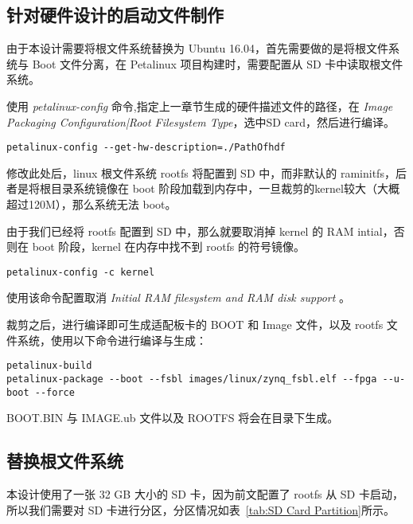 \subsection{针对硬件设计的启动文件制作}

由于本设计需要将根文件系统替换为 Ubuntu 16.04，首先需要做的是将根文件系统与 Boot 文件分离，在 Petalinux 项目构建时，需要配置从 SD 卡中读取根文件系统。

使用 \emph{petalinux-config} 命令,指定上一章节生成的硬件描述文件的路径，在 \emph{Image Packaging Configuration|Root Filesystem Type}，选中SD card，然后进行编译。

\begin{lstlisting}
petalinux-config --get-hw-description=./PathOfhdf
\end{lstlisting}

修改此处后，linux 根文件系统 rootfs 将配置到 SD 中，而非默认的  raminitfs，后者是将根目录系统镜像在 boot 阶段加载到内存中，一旦裁剪的kernel较大（大概超过120M），那么系统无法 boot。

由于我们已经将 rootfs 配置到 SD 中，那么就要取消掉 kernel 的 RAM intial，否则在 boot 阶段，kernel 在内存中找不到 rootfs 的符号镜像。

\begin{lstlisting}
petalinux-config -c kernel
\end{lstlisting}

使用该命令配置取消 \emph{Initial RAM filesystem and RAM disk support} 。

裁剪之后，进行编译即可生成适配板卡的 BOOT 和 Image 文件，以及 rootfs 文件系统，使用以下命令进行编译与生成：

\begin{lstlisting}
petalinux-build
petalinux-package --boot --fsbl images/linux/zynq_fsbl.elf --fpga --u-boot --force
\end{lstlisting}

BOOT.BIN 与 IMAGE.ub 文件以及 ROOTFS 将会在目录下生成。

\subsection{替换根文件系统}

本设计使用了一张 32 GB 大小的 SD 卡，因为前文配置了 rootfs 从 SD 卡启动，所以我们需要对 SD 卡进行分区，分区情况如表~\ref{tab:SD Card Partition}所示。

